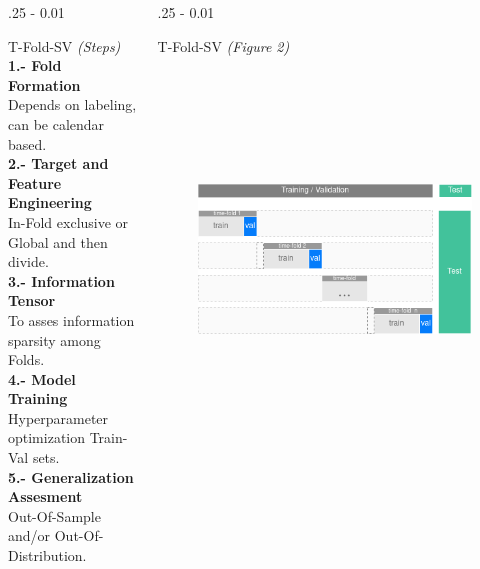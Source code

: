 \documentclass{postertheme}\usepackage[]{graphicx}\usepackage[]{color}
\begin{document}
\begin{frame}
\begin{columns}[onlytextwidth]
\begin{column}{.25 \textwidth - 0.01 \textwidth}
\begin{block}{T-Fold-SV \footnotesize \textit{(Steps)}}
      \textbf{1.- Fold Formation} \\
        Depends on labeling, can be calendar based.\\
      \textbf{2.- Target and Feature Engineering} \\
        In-Fold exclusive or Global and then divide.\\
      \textbf{3.- Information Tensor} \\
        To asses information sparsity among Folds.\\
      \textbf{4.- Model Training} \\
        Hyperparameter optimization Train-Val sets.\\
      \textbf{5.- Generalization Assesment} \\
        Out-Of-Sample and/or Out-Of-Distribution.
        
    \end{block}
  \end{column}

  \begin{column}{.25 \textwidth - 0.01 \textwidth}
    \begin{block}{T-Fold-SV \footnotesize \textit{(Figure 2)}}
        
      \begin{figure}
        \includegraphics[width=18cm, height=10cm, keepaspectratio=true]{figures/T-Fold-SV.png}
      \end{figure}
        
    \end{block}
  \end{column}
  

\end{columns}
\end{frame}
\end{document}
